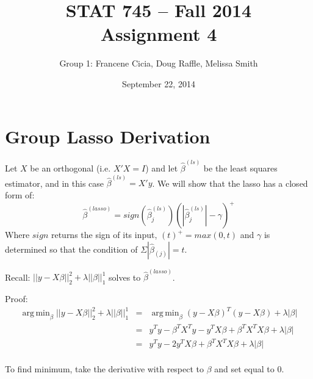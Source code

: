 \documentclass[a4paper]{article}
\title{\vspace{-30pt}STAT 745 -- Fall 2014\\Assignment 4}
\author{Group 1: Francene Cicia, Doug Raffle, Melissa Smith}
\date{September 22, 2014}
\DeclareMathOperator*{\argmin}{arg\,min}
\begin{document}
\setlength{\parindent}{0pt}
\vspace{-50pt}
\maketitle

\section{Group Lasso Derivation}

Let $X$ be an orthogonal (i.e. $X'X = I$) and let $\hat{\beta}^{\left(ls\right)}$ be the least squares estimator, and in this case $\hat{\beta}^{\left(ls\right)} = X'y$. We will show that the lasso has a closed form of:
\begin{equation*}
    \hat{\beta}^{\left(lasso\right)} = sign\left(\hat{\beta}_{j}^{\left(ls\right)}\right) \left(|\hat{\beta}_{j}^{\left(ls\right)}| -\gamma\right)^{+}
\end{equation*}
Where $sign$ returns the sign of its input, $\left(t\right)^{+}= max\left(0,t\right)$ and $\gamma$ is determined so that the condition of $\Sigma|\hat{\beta}_{\left(j\right)}|=t$.

\vspace{10pt}

Recall: $||{y-X\beta}||_{2}^{2} + \lambda ||{\beta}||_{1}^{1}$ solves to $\hat{\beta}^{\left(lasso\right)}$.
\vspace{10pt}

Proof: 
\begin{eqnarray}
\argmin_{\beta} ||{y-X\beta}||_{2}^{2} + \lambda ||{\beta}||_{1}^{1} & = &\argmin_{\beta} \left(y-X\beta\right)^{T}\left(y-X\beta\right) + \lambda |\beta| \nonumber\\
& = & y^{T}y - \beta^{T}X^{T}y - y^{T}X\beta + \beta^{T}X^{T}X\beta + \lambda |\beta| \nonumber\\
& = & y^{T}y - 2y^{T}X\beta + \beta^{T}X^{T}X\beta + \lambda |\beta| \nonumber
\end{eqnarray}\\
\vspace{10pt}
To find minimum, take the derivative with respect to $\beta$ and set equal to $0$.\\
\end{document}
